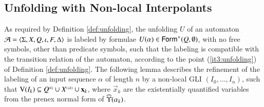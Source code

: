 \subsection{Unfolding with Non-local Interpolants}

As required by Definition \ref{def:unfolding}, the unfolding $U$ of an
automaton $\mathcal{A} = \langle \Sigma,X,Q,\iota,F,\Delta \rangle$ is labeled by
formulae $U(\alpha) \in \mathsf{Form}^+(Q,\emptyset)$, with no free symbols,
other than predicate symbols, such that the labeling is compatible
with the transition relation of the automaton, according to the point
(\ref{it3:unfolding}) of Definition \ref{def:unfolding}. The following
lemma describes the refinement of the labeling of an input sequence
$\alpha$ of length $n$ by a non-local GLI $(I_0, \ldots, I_n)$, such
that $\mathrm{V}({I_k}) \subseteq {Q}^{\scriptscriptstyle{({k})}} \cup {X}^{\scriptscriptstyle{({\leq k})}} \cup
\mathbf x_k$, where $\vec{x}_k$ are the existentially quantified
variables from the prenex normal form of $\widehat{\Upsilon}({\alpha_k})$. 


